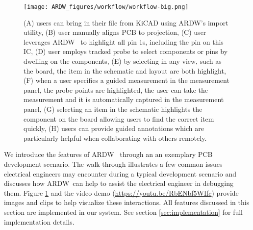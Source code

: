 \documentclass [11pt, proquest] {uwthesis}[2020/02/24]
\newcommand{\ARDWname}{ARDW}
\begin{document}
\begin{figure}
    \centering
    \texttt{[image: ARDW\_figures/workflow/workflow-big.png]}
    \caption{(A) users can bring in their file from KiCAD using \ARDWname's import utility, (B) user manually aligns PCB to projection, (C) user leverages \ARDWname~ to highlight all pin 1s, including the pin on this IC, (D) user employs tracked probe to select components or pins by dwelling on the components, (E) by selecting in any view, such as the board, the item in the schematic and layout are both highlight, (F) when a user specifies a guided measurement in the measurement panel, the probe points are highlighted, the user can take the measurement and it is automatically captured in the measurement panel, (G) selecting an item in the schematic highlights the component on the board allowing users to find the correct item quickly, (H) users can provide guided annotations which are particularly helpful when collaborating with others remotely.}
    \label{fig:workflow}
\end{figure}


We introduce the features of \ARDWname~ through an an exemplary PCB development scenario. 
{The walk-through illustrates a few common issues electrical engineers may encounter during a typical development scenario and discusses how \ARDWname~can help to assist the electrical engineer in debugging them. Figure {\ref{fig:workflow}} and the video demo}
({\textcolor{blue}{\url{https://youtu.be/RbENbf5WIfc}}})
{provide images and clips to help visualize these interactions.}
{All features discussed in this section are implemented in our system. See section {\ref{sec:implementation}} for full implementation details.}
\end{document}
